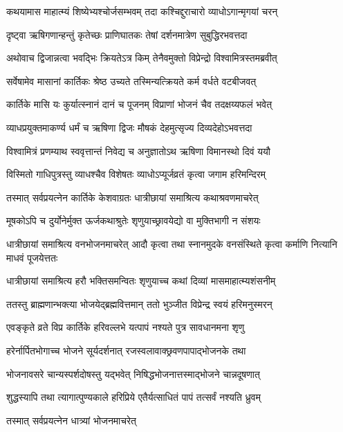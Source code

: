 \twolineshloka
{कथयामास माहात्म्यं शिष्येभ्यश्चोर्जसम्भवम्}
{तदा कश्चिद्दुराचारो व्याधोऽगान्मृगयां चरन्} %

\twolineshloka
{दृष्ट्वा ऋषिगणान्हन्तुं कृतेच्छः प्राणिघातकः}
{तेषां दर्शनमात्रेण सुबुद्धिरभवत्तदा} %

\twolineshloka
{अथोवाच द्विजान्नत्वा भवद्भिः क्रियतेऽत्र किम्}
{तेनैवमुक्तो विप्रेन्द्रो विश्वामित्रस्तमब्रवीत्} %


\twolineshloka
{सर्वेषामेव मासानां कार्तिकः श्रेष्ठ उच्यते}
{तस्मिन्यत्क्रियते कर्म वर्धते वटबीजवत्} %

\twolineshloka
{कार्तिके मासि यः कुर्यात्स्नानं दानं च पूजनम्}
{विप्राणां भोजनं चैव तदक्षय्यफलं भवेत्} %

\twolineshloka
{व्याधप्रयुक्तमाकर्ण्य धर्मं च ऋषिणा द्विजः}
{मौषकं देहमुत्सृज्य दिव्यदेहोऽभवत्तदा} %

\twolineshloka
{विश्वामित्रं प्रणम्याथ स्ववृत्तान्तं निवेद्य च}
{अनुज्ञातोऽथ ऋषिणा विमानस्थो दिवं ययौ} %

\twolineshloka
{विस्मितो गाधिपुत्रस्तु व्याधश्चैव विशेषतः}
{व्याधोऽप्यूर्जव्रतं कृत्वा जगाम हरिमन्दिरम्} %

\twolineshloka
{तस्मात् सर्वप्रयत्नेन कार्तिके केशवाग्रतः}
{धात्रीछायां समाश्रित्य कथाश्रवणमाचरेत्} %

\twolineshloka
{मूषकोऽपि च दुर्योनेर्मुक्त ऊर्जकथाश्रुतेः}
{शृणुयाच्छ्रावयेद्यो वा मुक्तिभागी न संशयः} %

\threelineshloka
{धात्रीछायां समाश्रित्य वनभोजनमाचरेत्}
{आदौ कृत्वा तथा स्नानमुदके वनसंस्थिते}
{कृत्वा कर्माणि नित्यानि माधवं पूजयेत्ततः} %

\twolineshloka
{धात्रीछायां समाश्रित्य हरौ भक्तिसमन्वितः}
{शृणुयाच्च कथां दिव्यां मासमाहात्म्यशंसनीम्} %

\twolineshloka
{ततस्तु ब्राह्मणान्भक्त्या भोजयेद्ब्रह्मवित्तमान्}
{ततो भुञ्जीत विप्रेन्द्र स्वयं हरिमनुस्मरन्} %

\twolineshloka
{एवङ्कृते व्रते विप्र कार्तिके हरिवल्लभे}
{यत्पापं नश्यते पुत्र सावधानमना शृणु} %

\twolineshloka
{हरेर्नार्पितभोगाच्च भोजने सूर्यदर्शनात्}
{रजस्वलावाक्छ्रवणपापाद्भोजनके तथा} %

\twolineshloka
{भोजनावसरे चान्यस्पर्शदोषस्तु यद्भवेत्}
{निषिद्धभोजनात्तस्माद्भोजने चान्नदूषणात्} %

\twolineshloka
{शुद्धस्यापि तथा त्यागात्पुण्यकाले हरिप्रिये}
{एतैर्यत्साधितं पापं तत्सर्वं नश्यति ध्रुवम्} %


\onelineshloka
{तस्मात् सर्वप्रयत्नेन धात्र्यां भोजनमाचरेत्} %

